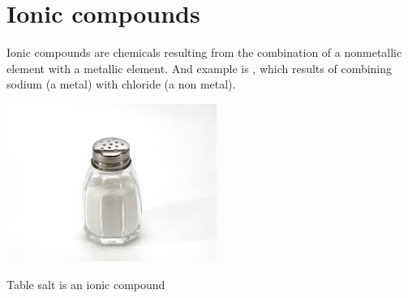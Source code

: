 \documentclass[main.tex]{subfiles}
\begin{document}
\section{Ionic compounds}
Ionic compounds are chemicals resulting from the combination of a nonmetallic element with a metallic element. And example is , which results of combining sodium (a metal) with chloride (a non metal).
\sloppy 
\begin{marginfigure}%
      \includegraphics{chapter5/figure4}
      \label{fig:marginfig}
      \caption{Table salt is an ionic compound}
	\end{marginfigure}%
\end{document}
